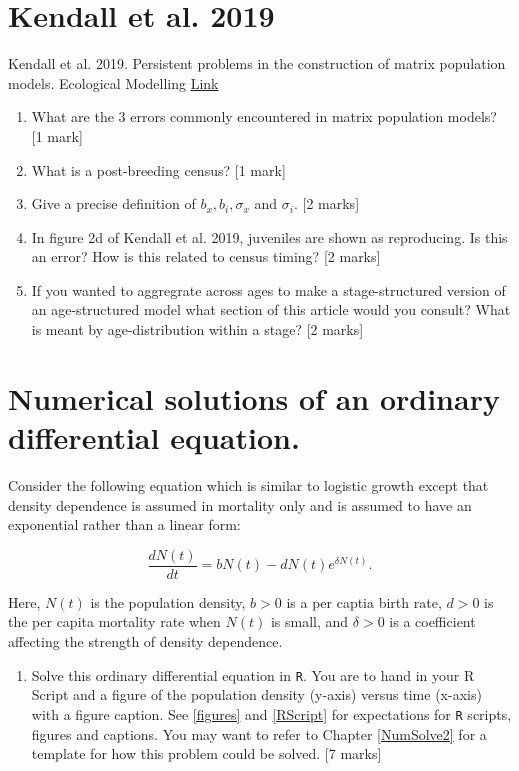 \documentclass[]{book}
\providecommand{\tightlist}{%
  \setlength{\itemsep}{0pt}\setlength{\parskip}{0pt}}
\begin{document}
\section{Kendall et al. 2019}\label{kendall-et-al.-2019}

Kendall et al. 2019. Persistent problems in the construction of matrix
population models. Ecological Modelling
\href{https://www.sciencedirect.com/science/article/pii/S0304380019301085}{Link}

\begin{enumerate}
\def\labelenumi{\arabic{enumi}.}
\item
  What are the 3 errors commonly encountered in matrix population
  models? {[}1 mark{]}
\item
  What is a post-breeding census? {[}1 mark{]}
\item
  Give a precise definition of \(b_x, b_i, \sigma_x\) and \(\sigma_i\).
  {[}2 marks{]}
\item
  In figure 2d of Kendall et al. 2019, juveniles are shown as
  reproducing. Is this an error? How is this related to census timing?
  {[}2 marks{]}
\item
  If you wanted to aggregrate across ages to make a stage-structured
  version of an age-structured model what section of this article would
  you consult? What is meant by age-distribution within a stage? {[}2
  marks{]}
\end{enumerate}

\section{Numerical solutions of an ordinary differential
equation.}\label{numerical-solutions-of-an-ordinary-differential-equation.}

Consider the following equation which is similar to logistic growth
except that density dependence is assumed in mortality only and is
assumed to have an exponential rather than a linear form:

\begin{equation}
\frac{dN(t)}{dt} = bN(t) - dN(t)e^{\delta N(t)}.
\end{equation}

Here, \(N(t)\) is the population density, \(b>0\) is a per captia birth
rate, \(d > 0\) is the per capita mortality rate when \(N(t)\) is small,
and \(\delta >0\) is a coefficient affecting the strength of density
dependence.

\begin{enumerate}
\def\labelenumi{\arabic{enumi}.}
\tightlist
\item
  Solve this ordinary differential equation in \texttt{R}. You are to
  hand in your R Script and a figure of the population density (y-axis)
  versus time (x-axis) with a figure caption. See \ref{figures} and
  \ref{RScript} for expectations for \texttt{R} scripts, figures and
  captions. You may want to refer to Chapter \ref{NumSolve2} for a
  template for how this problem could be solved. {[}7 marks{]}
\end{enumerate}
\end{document}
